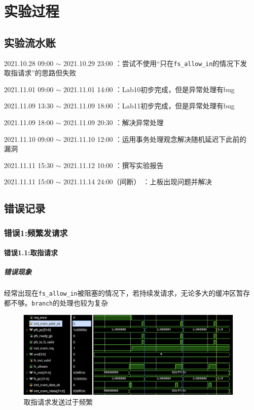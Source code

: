 \documentclass[UTF-8,twoside,c5size]{ctexart}
\begin{document}
	\section{实验过程}
	
	\subsection{实验流水账}
	
	2021.10.28 09:00 $\sim$ 2021.10.29 23:00 ：尝试不使用“只在\texttt{fs_allow_in}的情况下发取指请求”的思路但失败
	
	2021.11.01 09:00 $\sim$ 2021.11.01 14:00 ：Lab10初步完成，但是异常处理有bug
	
	2021.11.09 13:30 $\sim$ 2021.11.09 18:00 ：Lab11初步完成，但是异常处理有bug
	
	2021.11.09 18:00 $\sim$ 2021.11.09 20:30 ：解决异常处理
	
	2021.11.10 09:00 $\sim$ 2021.11.10 12:00 ：运用事务处理观念解决随机延迟下此前的漏洞
	
	2021.11.11 15:30 $\sim$ 2021.11.12 10:00 ：撰写实验报告
	
    2021.11.11 15:00 $\sim$ 2021.11.14 24:00（间断） ：上板出现问题并解决
    
	\subsection{错误记录}	
	\subsubsection{错误\textbf{1:}频繁发请求}
	
	\paragraph{错误\textbf{1.1:}取指请求}\hfill
	
	\subparagraph{错误现象}\hfill
	
	经常出现在\texttt{fs_allow_in}被阻塞的情况下，若持续发请求，无论多大的缓冲区暂存都不够。\texttt{branch}的处理也较为复杂
	
	\begin{figure}[h]
		\centering
		\includegraphics[width=0.85\linewidth]{inst_req_frequently.png}
		\caption[inst_req_frequently]{取指请求发送过于频繁}
		\label{fig:inst_req_frequently}
	\end{figure}
	
\end{document}
